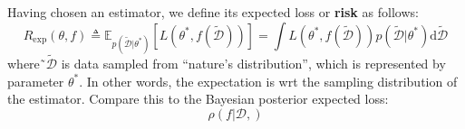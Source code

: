 Having chosen an estimator, we define its expected loss or \textbf{risk} as follows:
\begin{equation}
R_{\mathrm{exp}}(\theta,f) \triangleq \mathbb{E}_{p(\tilde{\mathcal{D}}|\theta^*)}[L(\theta^*, f(\tilde{\mathcal{D}}))]=\int L(\theta^*, f(\tilde{\mathcal{D}}))p(\tilde{\mathcal{D}}|\theta^*)\mathrm{d}\tilde{\mathcal{D}}
\end{equation}
where˜$\tilde{\mathcal{D}}$ is data sampled from “nature’s distribution”, which is represented by parameter $\theta^*$. In other words, the expectation is wrt the sampling distribution of the estimator. Compare this to the Bayesian posterior expected loss:
\begin{equation}
\rho(f|\mathcal{D},)
\end{equation}

